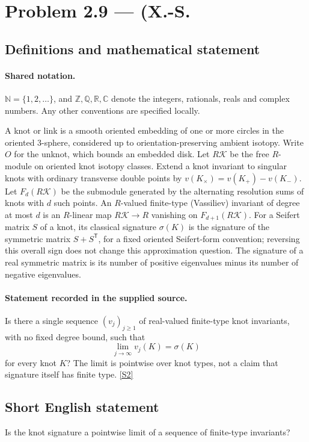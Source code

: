 \documentclass[11pt]{article}
\newcommand{\sref}[2]{\hyperlink{source:#1:#2}{[S#2]}}
\begin{document}
\section{Problem 2.9 — (X.-S.}\label{statement}

\subsection{Definitions and mathematical statement}

\paragraph{Shared notation.}$\mathbb N=\{1,2,\ldots\}$, and $\mathbb Z,\mathbb Q,\mathbb R,\mathbb C$ denote the integers, rationals, reals and complex numbers. Any other conventions are specified locally.


A knot or link is a smooth oriented embedding of one or more circles in the oriented $3$-sphere, considered up to orientation-preserving ambient isotopy. Write $O$ for the unknot, which bounds an embedded disk. Let $R\mathcal K$ be the free $R$-module on oriented knot isotopy classes. Extend a knot invariant to singular knots with ordinary transverse double points by $v(K_\times)=v(K_+)-v(K_-)$. Let $F_d(R\mathcal K)$ be the submodule generated by the alternating resolution sums of knots with $d$ such points. An $R$-valued finite-type (Vassiliev) invariant of degree at most $d$ is an $R$-linear map $R\mathcal K\to R$ vanishing on $F_{d+1}(R\mathcal K)$. For a Seifert matrix $S$ of a knot, its classical signature $\sigma(K)$ is the signature of the symmetric matrix $S+S^{\mathsf T}$, for a fixed oriented Seifert-form convention; reversing this overall sign does not change this approximation question. The signature of a real symmetric matrix is its number of positive eigenvalues minus its number of negative eigenvalues.
\paragraph{Statement recorded in the supplied source.}
Is there a single sequence $(v_j)_{j\ge1}$ of real-valued finite-type knot invariants, with no fixed degree bound, such that
\[\lim_{j\to\infty}v_j(K)=\sigma(K)\]
for every knot $K$? The limit is pointwise over knot types, not a claim that signature itself has finite type. \sref{statement}{2}
\subsection{Short English statement}
Is the knot signature a pointwise limit of a sequence of finite-type invariants?
\end{document}
